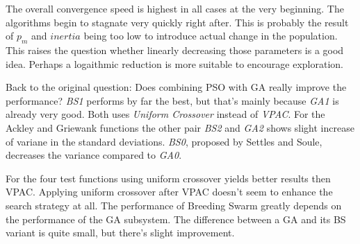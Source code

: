 \documentclass{acm_proc_article-sp}
\begin{document}
The overall convergence speed is highest in all cases at the very beginning. The algorithms begin to stagnate very quickly right after. This is probably the result of $p_m$ and $inertia$ being too low to introduce actual change in the population. This raises the question whether linearly decreasing those parameters is a good idea. Perhaps a logaithmic reduction is more suitable to encourage exploration.

Back to the original question: Does combining PSO with GA really improve the performance? \emph{BS1} performs by far the best, but that's mainly because \emph{GA1} is already very good. Both uses \emph{Uniform Crossover} instead of \emph{VPAC}. For the Ackley and Griewank functions the other pair \emph{BS2} and \emph{GA2} shows slight increase of variane in the standard deviations. \emph{BS0}, proposed by Settles and Soule, decreases the variance compared to \emph{GA0}.

For the four test functions using uniform crossover yields better results then VPAC. Applying uniform crossover after VPAC doesn't seem to enhance the search strategy at all. The performance of Breeding Swarm greatly depends on the performance of the GA subsystem. The difference between a GA and its BS variant is quite small, but there's slight improvement.
\end{document}
